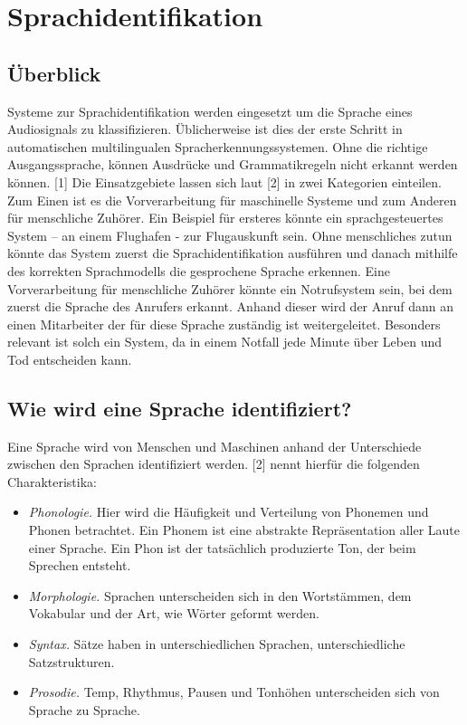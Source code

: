 \section{Sprachidentifikation}
\subsection{Überblick}
Systeme zur Sprachidentifikation werden eingesetzt um die Sprache eines Audiosignals zu klassifizieren. Üblicherweise ist dies der erste Schritt in automatischen multilingualen Spracherkennungssystemen.
Ohne die richtige Ausgangssprache, können Ausdrücke und Grammatikregeln nicht erkannt werden können. [1]
Die Einsatzgebiete lassen sich laut [2] in zwei Kategorien einteilen. Zum Einen ist es die Vorverarbeitung für maschinelle Systeme und zum Anderen für menschliche Zuhörer. Ein Beispiel für ersteres könnte ein sprachgesteuertes System – an einem Flughafen - zur Flugauskunft sein. Ohne menschliches zutun könnte das System zuerst die Sprachidentifikation ausführen und danach mithilfe des korrekten Sprachmodells die gesprochene Sprache erkennen.
Eine Vorverarbeitung für menschliche Zuhörer könnte ein Notrufsystem sein, bei dem zuerst die Sprache des Anrufers erkannt. Anhand dieser wird der Anruf dann an einen Mitarbeiter der für diese Sprache zuständig ist weitergeleitet. Besonders relevant ist solch ein System, da in einem Notfall jede Minute über Leben und Tod entscheiden kann.

\subsection{Wie wird eine Sprache identifiziert?}
Eine Sprache wird von Menschen und Maschinen anhand der Unterschiede zwischen den Sprachen identifiziert werden. [2] nennt hierfür die folgenden Charakteristika:
\item \begin{itemize}
\item \textit{Phonologie.} Hier wird die Häufigkeit und Verteilung von Phonemen und Phonen betrachtet. Ein Phonem ist eine abstrakte Repräsentation aller Laute einer Sprache. Ein Phon ist der tatsächlich produzierte Ton, der beim Sprechen entsteht.
\item \textit{Morphologie.} Sprachen unterscheiden sich in den Wortstämmen, dem Vokabular und der Art, wie Wörter geformt werden.
\item \textit{Syntax.} Sätze haben in unterschiedlichen Sprachen, unterschiedliche Satzstrukturen.
\item \textit{Prosodie.} Temp, Rhythmus, Pausen und Tonhöhen unterscheiden sich von Sprache zu Sprache.
\end{itemize}

